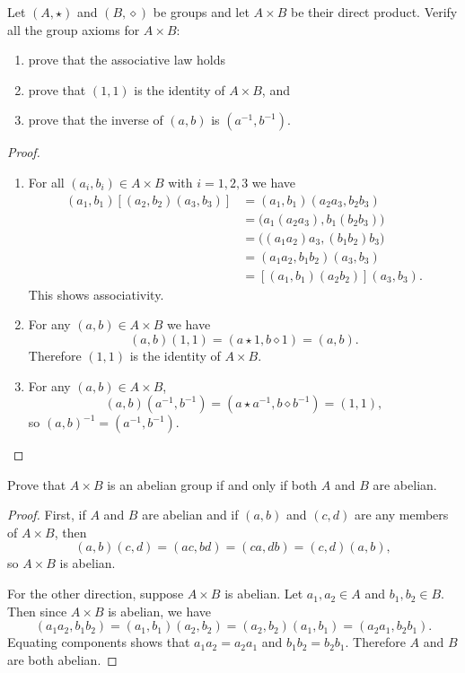  Let $(A,\star)$ and $(B,\diamond)$ be groups and let
$A\times B$ be their direct product. Verify all the group axioms for
$A\times B$:
\begin{enumerate}
\item prove that the associative law holds
\item prove that $(1,1)$ is the identity of $A\times B$, and
\item prove that the inverse of $(a,b)$ is $(a^{-1}, b^{-1})$.
\end{enumerate}
\begin{proof}
  \begin{enumerate}
  \item
    For all $(a_i, b_i)\in A\times B$ with $i = 1,2,3$ we have
    \begin{align*}
      (a_1,b_1)[(a_2,b_2)(a_3,b_3)]
      &= (a_1,b_1)(a_2a_3,b_2b_3) \\
      &= \big(a_1(a_2a_3), b_1(b_2b_3)\big) \\
      &= \big((a_1a_2)a_3, (b_1b_2)b_3\big) \\
      &= (a_1a_2,b_1b_2)(a_3,b_3) \\
      &= [(a_1,b_1)(a_2b_2)](a_3,b_3).
    \end{align*}
    This shows associativity.

  \item For any $(a,b)\in A\times B$ we have
    \begin{equation*}
      (a,b)(1,1) = (a\star1,b\diamond1) = (a,b).
    \end{equation*}
    Therefore $(1,1)$ is the identity of $A\times B$.

  \item For any $(a,b)\in A\times B$,
    \begin{equation*}
      (a,b)(a^{-1},b^{-1}) = (a\star a^{-1},b\diamond b^{-1})
      = (1,1),
    \end{equation*}
    so $(a,b)^{-1} = (a^{-1},b^{-1})$. \qedhere
  \end{enumerate}
\end{proof}

 Prove that $A\times B$ is an abelian group if and only
if both $A$ and $B$ are abelian.
\begin{proof}
  First, if $A$ and $B$ are abelian and if $(a,b)$ and $(c,d)$ are any
  members of $A\times B$, then
  \begin{equation*}
    (a,b)(c,d) = (ac,bd) = (ca,db) = (c,d)(a,b),
  \end{equation*}
  so $A\times B$ is abelian.

  For the other direction, suppose $A\times B$ is abelian. Let
  $a_1,a_2\in A$ and $b_1,b_2\in B$. Then since $A\times B$ is
  abelian, we have
  \begin{equation*}
    (a_1a_2, b_1b_2) = (a_1,b_1)(a_2,b_2)
    = (a_2, b_2)(a_1,b_1) = (a_2a_1, b_2b_1).
  \end{equation*}
  Equating components shows that $a_1a_2 = a_2a_1$ and
  $b_1b_2 = b_2b_1$. Therefore $A$ and $B$ are both abelian.
\end{proof}


